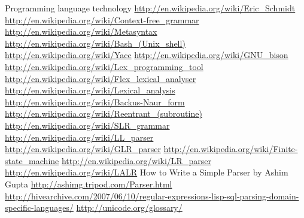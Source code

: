 Programming language technology
\newline
\url{http://en.wikipedia.org/wiki/Eric_Schmidt}
\newline
\url{http://en.wikipedia.org/wiki/Context-free_grammar}
\newline
\url{http://en.wikipedia.org/wiki/Metasyntax}
\newline
\url{http://en.wikipedia.org/wiki/Bash_(Unix_shell)}
\newline
\url{http://en.wikipedia.org/wiki/Yacc}
\newline
\url{http://en.wikipedia.org/wiki/GNU_bison}
\newline
\url{http://en.wikipedia.org/wiki/Lex_programming_tool}
\newline
\url{http://en.wikipedia.org/wiki/Flex_lexical_analyser}
\newline
\url{http://en.wikipedia.org/wiki/Lexical_analysis}
\newline
\url{http://en.wikipedia.org/wiki/Backus-Naur_form}
\newline
\url{http://en.wikipedia.org/wiki/Reentrant_(subroutine)}
\newline
\url{http://en.wikipedia.org/wiki/SLR_grammar}
\newline
\url{http://en.wikipedia.org/wiki/LL_parser}
\newline
\url{http://en.wikipedia.org/wiki/GLR_parser}
\newline
\url{http://en.wikipedia.org/wiki/Finite-state_machine}
\newline
\url{http://en.wikipedia.org/wiki/LR_parser}
\newline
\url{http://en.wikipedia.org/wiki/LALR}
\newline
How to Write a Simple Parser by Ashim Gupta
\newline
\url{http://ashimg.tripod.com/Parser.html}
\newline
\url{http://hivearchive.com/2007/06/10/regular-expressions-lisp-sql-parsing-domain-specific-languages/}
\newline
\url{http://unicode.org/glossary/}


